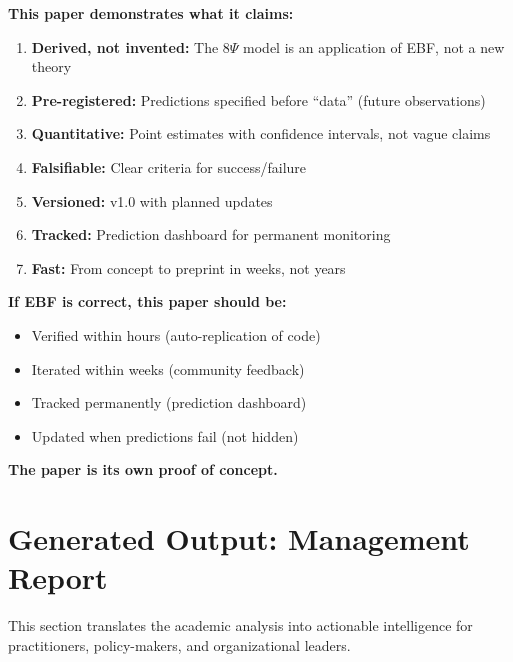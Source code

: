 \begin{tcolorbox}[colback=red!3!white, colframe=red!75!black,
    title=\textbf{REFLEXIVE VALIDITY}]

\textbf{This paper demonstrates what it claims:}

\begin{enumerate}[nosep]
    \item \textbf{Derived, not invented:} The 8$\Psi$ model is an application of EBF, not a new theory
    \item \textbf{Pre-registered:} Predictions specified before ``data'' (future observations)
    \item \textbf{Quantitative:} Point estimates with confidence intervals, not vague claims
    \item \textbf{Falsifiable:} Clear criteria for success/failure
    \item \textbf{Versioned:} v1.0 with planned updates
    \item \textbf{Tracked:} Prediction dashboard for permanent monitoring
    \item \textbf{Fast:} From concept to preprint in weeks, not years
\end{enumerate}

\textbf{If EBF is correct, this paper should be:}
\begin{itemize}[nosep]
    \item Verified within hours (auto-replication of code)
    \item Iterated within weeks (community feedback)
    \item Tracked permanently (prediction dashboard)
    \item Updated when predictions fail (not hidden)
\end{itemize}

\textbf{The paper is its own proof of concept.}

\end{tcolorbox}



\section{Generated Output: Management Report}
\label{sec:meta-management-report}

This section translates the academic analysis into actionable intelligence for
practitioners, policy-makers, and organizational leaders.

